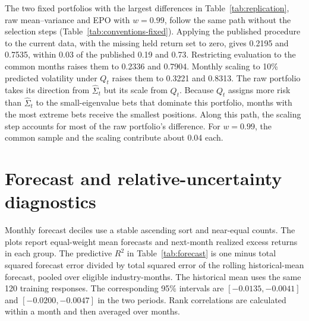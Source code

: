 The two fixed portfolios with the largest differences in Table~\ref{tab:replication}, raw mean--variance and EPO with $w=0.99$, follow the same path without the selection steps (Table~\ref{tab:conventions-fixed}). Applying the published procedure to the current data, with the missing held return set to zero, gives 0.2195 and 0.7535, within 0.03 of the published 0.19 and 0.73. Restricting evaluation to the common months raises them to 0.2336 and 0.7904. Monthly scaling to 10\% predicted volatility under $Q_t$ raises them to 0.3221 and 0.8313. The raw portfolio takes its direction from $\widehat\Sigma_t$ but its scale from $Q_t$. Because $Q_t$ assigns more risk than $\widehat\Sigma_t$ to the small-eigenvalue bets that dominate this portfolio, months with the most extreme bets receive the smallest positions. Along this path, the scaling step accounts for most of the raw portfolio's difference. For $w=0.99$, the common sample and the scaling contribute about 0.04 each.


\FloatBarrier

\section{Forecast and relative-uncertainty diagnostics}
\label{app:forecast}
\setcounter{table}{0}\setcounter{figure}{0}
Monthly forecast deciles use a stable ascending sort and near-equal counts. The plots report equal-weight mean forecasts and next-month realized excess returns in each group. The predictive $R^2$ in Table~\ref{tab:forecast} is one minus total squared forecast error divided by total squared error of the rolling historical-mean forecast, pooled over eligible industry-months. The historical mean uses the same 120 training responses. The corresponding 95\% intervals are $[-0.0135,-0.0041]$ and $[-0.0200,-0.0047]$ in the two periods. Rank correlations are calculated within a month and then averaged over months.

